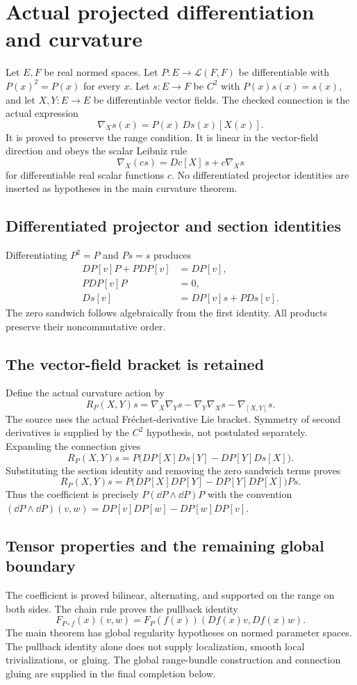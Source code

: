 \section{Actual projected differentiation and curvature}\label{supp4:section:002}
Let $E,F$ be real normed spaces. Let $P:E\to\mathcal L(F,F)$ be differentiable with $P(x)^2=P(x)$ for every $x$. Let $s:E\to F$ be $C^2$ with $P(x)s(x)=s(x)$, and let $X,Y:E\to E$ be differentiable vector fields. The checked connection is the actual expression
\[
\nabla_Xs(x)=P(x)\,Ds(x)[X(x)].
\]
It is proved to preserve the range condition. It is linear in the vector-field direction and obeys the scalar Leibniz rule
\[
\nabla_X(cs)=Dc[X]\,s+c\nabla_Xs
\]
for differentiable real scalar functions $c$. No differentiated projector identities are inserted as hypotheses in the main curvature theorem.

\subsection{Differentiated projector and section identities}
Differentiating $P^2=P$ and $Ps=s$ produces
\begin{align*}
DP[v]P+PDP[v]&=DP[v],\\
PDP[v]P&=0,\\
Ds[v]&=DP[v]s+P Ds[v].
\end{align*}
The zero sandwich follows algebraically from the first identity. All products preserve their noncommutative order.

\subsection{The vector-field bracket is retained}
Define the actual curvature action by
\[
R_P(X,Y)s=\nabla_X\nabla_Ys-\nabla_Y\nabla_Xs-\nabla_{[X,Y]}s.
\]
The source uses the actual Fr\'echet-derivative Lie bracket. Symmetry of second derivatives is supplied by the $C^2$ hypothesis, not postulated separately. Expanding the connection gives
\[
R_P(X,Y)s=P\bigl(DP[X]Ds[Y]-DP[Y]Ds[X]\bigr).
\]
Substituting the section identity and removing the zero sandwich terms proves
\[
\boxed{R_P(X,Y)s=P\bigl(DP[X]DP[Y]-DP[Y]DP[X]\bigr)P s.}
\]
Thus the coefficient is precisely $P(\dd P\wedge\dd P)P$ with the convention
$(\dd P\wedge\dd P)(v,w)=DP[v]DP[w]-DP[w]DP[v]$.

\subsection{Tensor properties and the remaining global boundary}
The coefficient is proved bilinear, alternating, and supported on the range on both sides. The chain rule proves the pullback identity
\[
F_{P\circ f}(x)(v,w)=F_P(f(x))(Df(x)v,Df(x)w).
\]
The main theorem has global regularity hypotheses on normed parameter spaces. The pullback identity alone does not supply localization, smooth local trivializations, or gluing. The global range-bundle construction and connection gluing are supplied in the final completion below.




